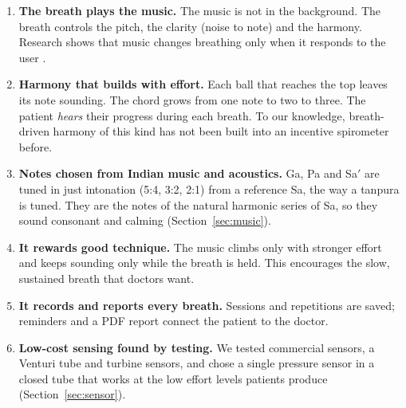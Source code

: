 \documentclass[12pt,a4paper]{article}
\newcommand{\Sah}{Sa\ensuremath{'}}     %
\begin{document}
\begin{enumerate}
  \item \textbf{The breath plays the music.} The music is not in the background. The breath controls the pitch, the clarity (noise to note) and the harmony. Research shows that music changes breathing only when it responds to the user \cite{bhandari}.
  \item \textbf{Harmony that builds with effort.} Each ball that reaches the top leaves its note sounding. The chord grows from one note to two to three. The patient \emph{hears} their progress during each breath. To our knowledge, breath-driven harmony of this kind has not been built into an incentive spirometer before.
  \item \textbf{Notes chosen from Indian music and acoustics.} Ga, Pa and \Sah{} are tuned in just intonation (5:4, 3:2, 2:1) from a reference Sa, the way a tanpura is tuned. They are the notes of the natural harmonic series of Sa, so they sound consonant and calming (Section~\ref{sec:music}).
  \item \textbf{It rewards good technique.} The music climbs only with stronger effort and keeps sounding only while the breath is held. This encourages the slow, sustained breath that doctors want.
  \item \textbf{It records and reports every breath.} Sessions and repetitions are saved; reminders and a PDF report connect the patient to the doctor.
  \item \textbf{Low-cost sensing found by testing.} We tested commercial sensors, a Venturi tube and turbine sensors, and chose a single pressure sensor in a closed tube that works at the low effort levels patients produce (Section~\ref{sec:sensor}).
\end{enumerate}
\end{document}
